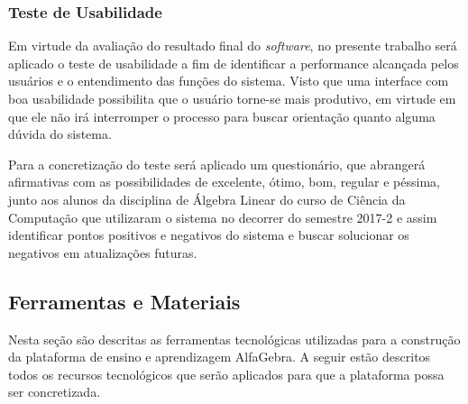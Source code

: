 \subsubsection{Teste de Usabilidade}
\noindent Em virtude da avaliação do resultado final do \textit{software}, no presente trabalho será aplicado o teste de usabilidade a fim de identificar a performance alcançada pelos usuários e o entendimento das funções do sistema. Visto que uma interface com boa usabilidade possibilita que o usuário torne-se mais produtivo, em virtude em que ele não irá interromper o processo para buscar orientação quanto alguma dúvida do sistema.

Para a concretização do teste será aplicado um questionário, que abrangerá afirmativas com as possibilidades de excelente, ótimo, bom, regular e péssima, junto aos alunos da disciplina de Álgebra Linear do curso de Ciência da Computação que utilizaram o sistema no decorrer do semestre 2017-2 e assim identificar pontos positivos e negativos do sistema e buscar solucionar os negativos em atualizações futuras. 

\begin{comment}
\subsection{Diagramas UML}
\noindent

\subsubsection{Diagrama de Caso de Uso}
\noindent

\subsubsection{Diagrama de Classe}
\noindent

\subsubsection{Diagrama de Atividade}
\noindent

\subsubsection{Diagrama de Implementação}
\noindent
\end{comment}

\subsection{Ferramentas e Materiais}
\noindent Nesta seção são descritas as ferramentas tecnológicas utilizadas para a construção da plataforma de ensino e aprendizagem AlfaGebra. A seguir estão descritos todos os recursos tecnológicos que serão aplicados para que a plataforma possa ser concretizada.

